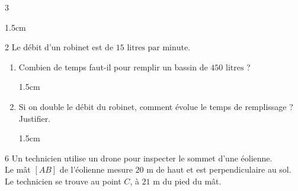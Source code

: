 \documentclass[a4paper]{book}
\begin{document}
{\begin{exerciceNote}{3}
\begin{enumerate}[leftmargin=*]
            \begin{ZoneReponse}{1.5cm}                
            \end{ZoneReponse}
        \end{enumerate}
    \end{exerciceNote}


    \begin{exerciceNote}{2}
        Le débit d'un robinet est de $15 \text{ litres par minute}$.
        \begin{enumerate}[leftmargin=*]
            \item 
            Combien de temps faut-il pour remplir un bassin de $450 \text{ litres}$ ? 
            \begin{ZoneReponse}{1.5cm}                
            \end{ZoneReponse}

            \item Si on double le débit du robinet, comment évolue le temps de remplissage ? Justifier.
            \begin{ZoneReponse}{1.5cm}                
            \end{ZoneReponse}
        \end{enumerate}
    \end{exerciceNote}


    \begin{exerciceNote}{6}
        Un technicien utilise un drone pour inspecter le sommet d'une éolienne. \\
        Le mât $[AB]$ de l'éolienne mesure $20\text{ m}$ de haut et est perpendiculaire au sol. \\
        Le technicien se trouve au point $C$, à $21\text{ m}$ du pied du mât.

        \begin{center}
\end{center}
\end{exerciceNote}}
\end{document}
